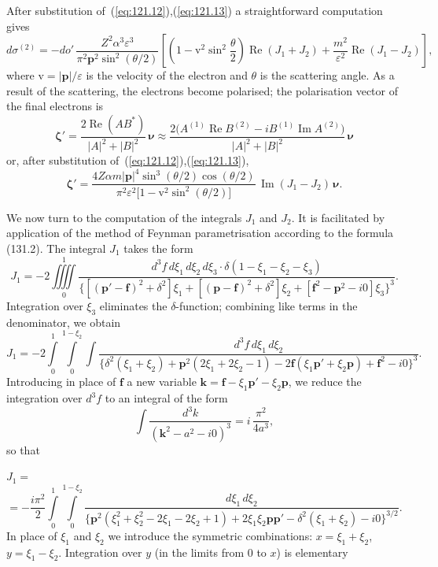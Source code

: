 \noindent After substitution of~(\ref{eq:121.12}),(\ref{eq:121.13}) a straightforward computation gives
\begin{equation}
d\sigma^{(2)} = -do'\,\frac{Z^2\alpha^3\varepsilon^3}{\pi^2\mathbf{p}^2\sin^2(\theta/2)}\left[\left(1 - \mathrm{v}^2\sin^2\frac{\theta}{2}\right)\operatorname{Re}(J_1 + J_2) + \frac{m^2}{\varepsilon^2}\operatorname{Re}(J_1 - J_2)\right],
\label{eq:121.14}
\end{equation}
where $\mathrm{v} = |\mathbf{p}|/\varepsilon$ is the velocity of the electron and $\theta$ is the scattering angle. As a result of the scattering, the electrons become polarised; the polarisation vector of the final electrons is
\[
\boldsymbol{\zeta}' = \frac{2\operatorname{Re}(AB^*)}{|A|^2 + |B|^2}\,\boldsymbol{\nu} \approx \frac{2\bigl(A^{(1)}\operatorname{Re} B^{(2)} - iB^{(1)}\operatorname{Im} A^{(2)}\bigr)}{|A|^2 + |B|^2}\,\boldsymbol{\nu}
\]
or, after substitution of~(\ref{eq:121.12}),(\ref{eq:121.13}),
\begin{equation}
\boldsymbol{\zeta}' = \frac{4Z\alpha m|\mathbf{p}|^4\sin^3(\theta/2)\cos(\theta/2)}{\pi^2\varepsilon^2\bigl[1 - \mathrm{v}^2\sin^2(\theta/2)\bigr]}\,\operatorname{Im}(J_1 - J_2)\,\boldsymbol{\nu}.
\label{eq:121.15}
\end{equation}

We now turn to the computation of the integrals $J_1$ and $J_2$. It is facilitated by application of the method of Feynman parametrisation according to the formula (131.2). The integral $J_1$ takes the form
\[
J_1 = -2\iiiint\limits_0^1 \frac{d^3\!f\,d\xi_1\,d\xi_2\,d\xi_3\cdot\delta(1 - \xi_1 - \xi_2 - \xi_3)}{\bigl\{[(\mathbf{p}' - \mathbf{f})^2 + \delta^2]\xi_1 + [(\mathbf{p} - \mathbf{f})^2 + \delta^2]\xi_2 + [\mathbf{f}^2 - \mathbf{p}^2 - i0]\xi_3\bigr\}^3}.
\]
Integration over $\xi_3$ eliminates the $\delta$-function; combining like terms in the denominator, we obtain
\[
J_1 = -2\int\limits_0^1\int\limits_0^{1-\xi_2} \int \frac{d^3\!f\,d\xi_1\,d\xi_2}{\bigl\{\delta^2(\xi_1 + \xi_2) + \mathbf{p}^2(2\xi_1 + 2\xi_2 - 1) - 2\mathbf{f}(\xi_1\mathbf{p}' + \xi_2\mathbf{p}) + \mathbf{f}^2 - i0\bigr\}^3}.
\]
Introducing in place of $\mathbf{f}$ a new variable $\mathbf{k} = \mathbf{f} - \xi_1\mathbf{p}' - \xi_2\mathbf{p}$, we reduce the integration over $d^3\!f$ to an integral of the form
\[
\int \frac{d^3 k}{(\mathbf{k}^2 - a^2 - i0)^3} = i\,\frac{\pi^2}{4a^3},
\]
so that

$J_1 =$
\[
= -\frac{i\pi^2}{2}\int\limits_0^1\int\limits_0^{1-\xi_2}\frac{d\xi_1\,d\xi_2}{\bigl\{\mathbf{p}^2(\xi_1^2 + \xi_2^2 - 2\xi_1 - 2\xi_2 + 1) + 2\xi_1\xi_2\mathbf{p}\mathbf{p}' - \delta^2(\xi_1 + \xi_2) - i0\bigr\}^{3/2}}.
\]
In place of $\xi_1$ and $\xi_2$ we introduce the symmetric combinations: $x = \xi_1 + \xi_2$, $y = \xi_1 - \xi_2$. Integration over $y$ (in the limits from $0$ to $x$) is elementary

